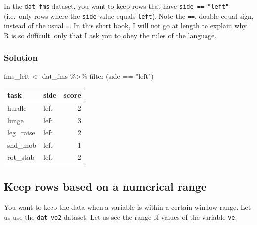 \documentclass[
]{book}
\newenvironment{Shaded}{\begin{snugshade}}{\end{snugshade}}
\newcommand{\FunctionTok}[1]{\textcolor[rgb]{0.00,0.00,0.00}{#1}}
\newcommand{\NormalTok}[1]{#1}
\newcommand{\OtherTok}[1]{\textcolor[rgb]{0.56,0.35,0.01}{#1}}
\newcommand{\SpecialCharTok}[1]{\textcolor[rgb]{0.00,0.00,0.00}{#1}}
\newcommand{\StringTok}[1]{\textcolor[rgb]{0.31,0.60,0.02}{#1}}
\begin{document}
In the \texttt{dat\_fms} dataset, you want to keep rows that have \texttt{side\ ==\ "left"} (i.e.~only rows where the \texttt{side} value equals \texttt{left}). Note the \texttt{==}, double equal sign, instead of the usual \texttt{=}. In this short book, I will not go at length to explain why R is so difficult, only that I ask you to obey the rules of the language.

\hypertarget{solution-10}{%
\subsubsection{Solution}\label{solution-10}}

\begin{Shaded}
\begin{Highlighting}[]
\NormalTok{fms\_left }\OtherTok{\textless{}{-}}\NormalTok{ dat\_fms }\SpecialCharTok{\%\textgreater{}\%}
  \FunctionTok{filter}\NormalTok{ (side }\SpecialCharTok{==} \StringTok{"left"}\NormalTok{) }
\end{Highlighting}
\end{Shaded}

\begin{tabular}{l|l|r}
\hline
task & side & score\\
\hline
hurdle & left & 2\\
\hline
lunge & left & 3\\
\hline
leg\_raise & left & 2\\
\hline
shd\_mob & left & 1\\
\hline
rot\_stab & left & 2\\
\hline
\end{tabular}

\hypertarget{WRANGLE-FILTER-KEEP-NUMERIC}{%
\subsection{Keep rows based on a numerical range}\label{WRANGLE-FILTER-KEEP-NUMERIC}}

You want to keep the data when a variable is within a certain window range. Let us use the \texttt{dat\_vo2} dataset. Let us see the range of values of the variable \texttt{ve}.

\begin{Shaded}
\end{Shaded}
\end{document}
